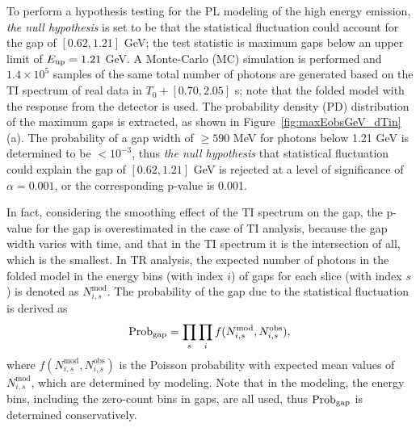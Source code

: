 \documentclass[linenumbers,twocolumn]{aastex631}
\begin{document}
To perform a hypothesis testing for the PL modeling of the high energy emission, \textit{the null hypothesis} is set to be that the statistical fluctuation could account for the gap of $[0.62,1.21]$ GeV; the test statistic is maximum gaps below an upper limit of $E_{\rm up}=1.21$ GeV. %
A Monte-Carlo (MC) simulation is performed and $1.4\times10^5$ samples of the same total number of photons are generated based on the TI spectrum of real data in $T_0+[0.70,2.05]$ s; note that the folded model with the response from the detector is used. The probability density (PD) distribution of the maximum gaps is extracted, as shown in Figure~\ref{fig:maxEobsGeV_dTin} (a). The probability of a gap width of $\geq590$ MeV for photons below 1.21 GeV is determined to be $<10^{-3}$, thus \textit{the null hypothesis} that statistical fluctuation could explain the gap of $[0.62,1.21]$ GeV is rejected at a level of significance of $\alpha=0.001$, or the corresponding p-value is 0.001. 


In fact, considering the smoothing effect of the TI spectrum on the gap, the p-value for the gap is overestimated in the case of TI analysis, because the gap width varies with time, and that in the TI spectrum it is the intersection of all, which is the smallest. In TR analysis, the expected number of photons in the folded model in the energy bins (with index $i$) of gaps for each slice (with index $s$) is denoted as $N^{\mathrm{mod}}_{i,s}$. The probability of the gap due to the statistical fluctuation is derived as
\begin{equation}
\mathrm{Prob_{\rm gap}}=\prod_s \prod_i f(N^{\mathrm{mod}}_{i,s}, N^{\mathrm{obs}}_{i,s}),   
\end{equation}
where $f(N^{\mathrm{mod}}_{i,s}, N^{\mathrm{obs}}_{i,s})$ is the Poisson probability with expected mean values of $N^{\mathrm{mod}}_{i,s}$, which are determined by modeling. Note that in the modeling, the energy bins, including the zero-count bins in gaps, are all used, thus $\rm Prob_{\rm gap}$ is determined conservatively. 
\end{document}
